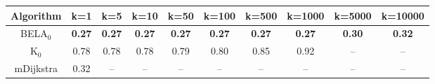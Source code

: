 \begin{tabular}{c|ccccccccc}\toprule
Algorithm & k=1 & k=5 & k=10 & k=50 & k=100 & k=500 & k=1000 & k=5000 & k=10000 \\ \midrule
BELA$_0$ & \textbf{0.27} & \textbf{0.27} & \textbf{0.27} & \textbf{0.27} & \textbf{0.27} & \textbf{0.27} & \textbf{0.27} & \textbf{0.30} & \textbf{0.32} \\
K$_0$ & 0.78 & 0.78 & 0.78 & 0.79 & 0.80 & 0.85 & 0.92 & -- & -- \\
mDijkstra & 0.32 & -- & -- & -- & -- & -- & -- & -- & -- \\ \bottomrule 
\end{tabular}
